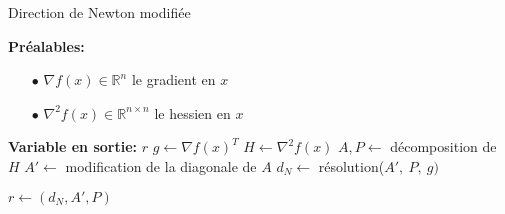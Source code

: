 \begin{algorithm}%
\caption{Direction de Newton modifi\'ee}          %
\label{alg:2}                           %
\begin{algorithmic}
\STATE \textbf{Pr\'ealables:} %
\begin{itemize}
\item[$\bullet$] $\nabla f(x)\in \mathbb{R}^n$ le gradient en $x$
\item[$\bullet$] $\nabla^2 f(x)\in \mathbb{R}^{n\times n}$ le hessien en $x$
\end{itemize}
\STATE \textbf{Variable en sortie:} $r$
\STATE $g \leftarrow \nabla f(x)^T$
\STATE $H \leftarrow \nabla^2 f(x)$
\STATE $A,P \leftarrow $ d\'ecomposition de $H$
\STATE $A' \leftarrow$ modification de la diagonale de $A$
\STATE $d_N \leftarrow$ r\'esolution($A',\ P,\ g)$


\STATE $r\leftarrow (d_N,A',P)$
\end{algorithmic}
\end{algorithm}




